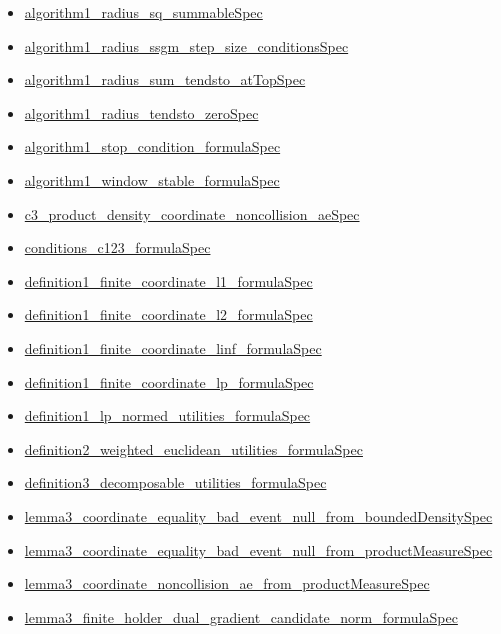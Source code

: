 \documentclass[10pt]{article}
\begin{document}
\begin{itemize}[leftmargin=1.2em]
\begin{itemize}[leftmargin=1.2em]
\item \hyperlink{source-claim-feefad880b5b8cc8}{algorithm1\_radius\_sq\_summableSpec}
\item \hyperlink{source-claim-0b205aab018f3bcb}{algorithm1\_radius\_ssgm\_step\_size\_conditionsSpec}
\item \hyperlink{source-claim-ce6ed26ad4d98cd3}{algorithm1\_radius\_sum\_tendsto\_atTopSpec}
\item \hyperlink{source-claim-ed1c239a4d71f093}{algorithm1\_radius\_tendsto\_zeroSpec}
\item \hyperlink{source-claim-f5582541b0eca601}{algorithm1\_stop\_condition\_formulaSpec}
\item \hyperlink{source-claim-d399110cb2008aaf}{algorithm1\_window\_stable\_formulaSpec}
\item \hyperlink{source-claim-5733b74f6b39bb81}{c3\_product\_density\_coordinate\_noncollision\_aeSpec}
\item \hyperlink{source-claim-695aae8edbfcdf18}{conditions\_c123\_formulaSpec}
\item \hyperlink{source-claim-92f9aa83d7f7fe74}{definition1\_finite\_coordinate\_l1\_formulaSpec}
\item \hyperlink{source-claim-99e53b00c8291417}{definition1\_finite\_coordinate\_l2\_formulaSpec}
\item \hyperlink{source-claim-0d61cc7c1cd21b16}{definition1\_finite\_coordinate\_linf\_formulaSpec}
\item \hyperlink{source-claim-27c15d13368b1478}{definition1\_finite\_coordinate\_lp\_formulaSpec}
\item \hyperlink{source-claim-2cc921d535fb2213}{definition1\_lp\_normed\_utilities\_formulaSpec}
\item \hyperlink{source-claim-c46295147d5004f8}{definition2\_weighted\_euclidean\_utilities\_formulaSpec}
\item \hyperlink{source-claim-a8574105e720bec5}{definition3\_decomposable\_utilities\_formulaSpec}
\item \hyperlink{source-claim-a973f59ed0e1cc66}{lemma3\_coordinate\_equality\_bad\_event\_null\_from\_boundedDensitySpec}
\item \hyperlink{source-claim-4de262cc3cbceb90}{lemma3\_coordinate\_equality\_bad\_event\_null\_from\_productMeasureSpec}
\item \hyperlink{source-claim-06e42dc4cb47855b}{lemma3\_coordinate\_noncollision\_ae\_from\_productMeasureSpec}
\item \hyperlink{source-claim-ecf761bbd6bd7ecd}{lemma3\_finite\_holder\_dual\_gradient\_candidate\_norm\_formulaSpec}

\end{itemize}
\end{itemize}
\end{document}

